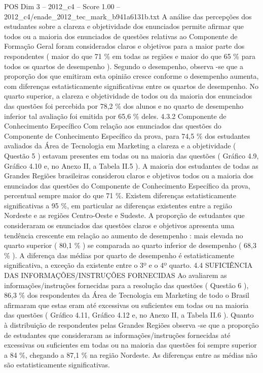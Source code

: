 \begin{textsample}{POS Dim 3 – 2012\_c4 – Score 1.00 – 2012\_c4/enade\_2012\_tec\_mark\_b941a6131b.txt}
A análise das percepções dos estudantes sobre a clareza e objetividade dos enunciados permite afirmar que todos ou a maioria dos enunciados de questões relativas ao Componente de Formação Geral foram considerados claros e objetivos para a maior parte dos respondentes ( maior do que 71 \% em todas as regiões e maior do que 65 \% para todos os quartos de desempenho ).
Segundo o desempenho, observa -se que a proporção dos que emitiram esta opinião cresce conforme o desempenho aumenta, com diferenças estatisticamente significativas entre os quartos de desempenho.
No quarto superior, a clareza e objetividade de todos ou da maioria dos enunciados das questões foi percebida por 78,2 \% dos alunos e no quarto de desempenho inferior tal avaliação foi emitida por 65,6 \% deles. 4.3.2 Componente de Conhecimento Específico Com relação aos enunciados das questões do Componente de Conhecimento Específico da prova, para 74,5 \% dos estudantes avaliados da Área de Tecnologia em Marketing a clareza e a objetividade ( Questão 5 ) estavam presentes em todas ou na maioria das questões ( Gráfico 4.9, Gráfico 4.10 e, no Anexo II, a Tabela II.5 ).
A maioria dos estudantes de todas as Grandes Regiões brasileiras considerou claros e objetivos todos ou a maioria dos enunciados das questões do Componente de Conhecimento Específico da prova, percentual sempre maior do que 71 \%.
Existem diferenças estatisticamente significativas a 95 \%, em particular as diferenças existentes entre a região Nordeste e as regiões Centro-Oeste e Sudeste.
A proporção de estudantes que consideraram os enunciados das questões claros e objetivos apresenta uma tendência crescente em relação ao aumento de desempenho : mais elevada no quarto superior ( 80,1 \% ) se comparada ao quarto inferior de desempenho ( 68,3 \% ).
A diferença das médias por quarto de desempenho é estatisticamente significativa, a exceção da existente entre o 3º e o 4º quarto. 4.4 SUFICIÊNCIA DAS INFORMAÇÕES/INSTRUÇÕES FORNECIDAS Ao avaliarem as informações/instruções fornecidas para a resolução das questões ( Questão 6 ), 86,3 \% dos respondentes da Área de Tecnologia em Marketing de todo o Brasil afirmaram que estas eram até excessivas ou suficientes em todas ou na maioria das questões ( Gráfico 4.11, Gráfico 4.12 e, no Anexo II, a Tabela II.6 ).
Quanto à distribuição de respondentes pelas Grandes Regiões observa -se que a proporção de estudantes que consideraram as informações/instruções fornecidas até excessivas ou suficientes em todas ou na maioria das questões foi sempre superior a 84 \%, chegando a 87,1 \% na região Nordeste.
As diferenças entre as médias não são estatisticamente significativas.

\end{textsample}
